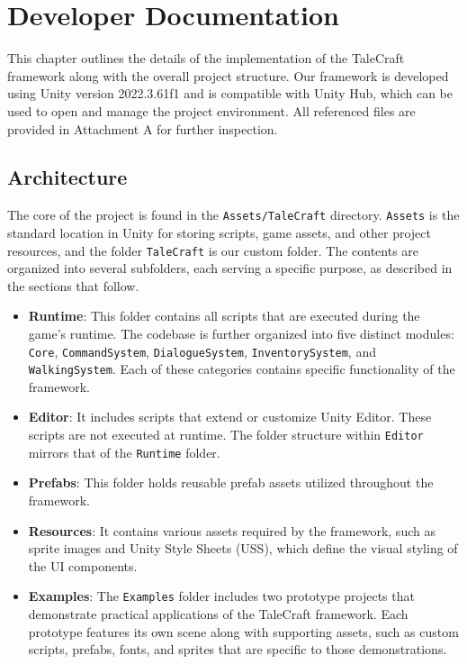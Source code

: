 \chapter{Developer Documentation}
This chapter outlines the details of the implementation of the TaleCraft framework along with the overall project structure. Our framework is developed using Unity version 2022.3.61f1 and is compatible with Unity Hub, which can be used to open and manage the project environment. All referenced files are provided in Attachment A for further inspection.

\section{Architecture}
The core of the project is found in the \verb|Assets/TaleCraft| directory. \verb|Assets| is the standard location in Unity for storing scripts, game assets, and other project resources, and the folder \verb|TaleCraft| is our custom folder. The contents are organized into several subfolders, each serving a specific purpose, as described in the sections that follow.

\begin{itemize}
    \item \textbf{Runtime}: This folder contains all scripts that are executed during the game’s runtime. The codebase is further organized into five distinct modules: \verb|Core|, \verb|CommandSystem|, \verb|DialogueSystem|, \verb|InventorySystem|, and \verb|WalkingSystem|. Each of these categories contains specific functionality of the framework.
    \item \textbf{Editor}: It includes scripts that extend or customize Unity Editor. These scripts are not executed at runtime. The folder structure within \verb|Editor| mirrors that of the \verb|Runtime| folder.
    \item \textbf{Prefabs}: This folder holds reusable prefab assets utilized throughout the framework.
    \item \textbf{Resources}: It contains various assets required by the framework, such as sprite images and Unity Style Sheets (USS), which define the visual styling of the UI components. 
    \item \textbf{Examples}: The \verb|Examples| folder includes two prototype projects that demonstrate practical applications of the TaleCraft framework. Each prototype features its own scene along with supporting assets, such as custom scripts, prefabs, fonts, and sprites that are specific to those demonstrations. 
\end{itemize}

